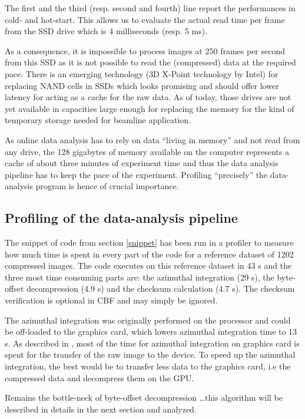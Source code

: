 \documentclass[preprint]{iucr}              %
\begin{document}
The first and the third (resp. second and fourth) line report the performances
in cold- and hot-start.
This allows us to evaluate the actual read time per frame from the SSD
drive which is 4 milliseconds (resp. 5 ms).

As a consequence, it is impossible to process images at 250 frames per
second from this SSD as it is not possible to read the (compressed) data
at the required pace.
There is an emerging technology (3D X-Point technology by Intel) for replacing
NAND cells in SSDs which looks promising and should offer
lower latency for acting as a cache for the raw data. 
As of today, those drives are not yet available in capacities large
enough for replacing the memory for the kind of temporary storage needed for
beamline application.

As online data analysis has to rely on data ``living in memory'' and not
read from any drive, the 128 gigabytes of memory available on the computer
represents a cache of about three minutes of experiment time and thus the data
analysis pipeline has to keep the pace of the experiment. 
Profiling ``precisely'' the data-analysis program is hence of crucial
importance.

\subsection{Profiling of the data-analysis pipeline}

The snippet of code from section \ref{snippet} has been run in a profiler to
measure how much time is spent in every part of the code for a reference
dataset of 1202 compressed images.
The code executes on this reference dataset in 43 s and the
three most time consuming parts are: the azimuthal integration (29 s), the
byte-offset decompression (4.9 s) and the checksum calculation (4.7 s).
The checksum verification is optional in CBF and may simply be ignored.

The azimuthal integration was originally performed on the processor and could be
off-loaded to the graphics card, which lowers azimuthal integration time to 13 s.
As described in \cite{kieffer_ashiotis-proc-euroscipy-2014}, most of the time
for azimuthal integration on graphics card is spent for the transfer of the raw image to the device.
To speed up the azimuthal integration, the best would be to transfer less data
to the graphics card, i.e the compressed data and decompress them on the GPU.

Remains the bottle-neck of byte-offset decompression \ldots this algorithm will
be described in details in the next section and analyzed. 
\end{document}
